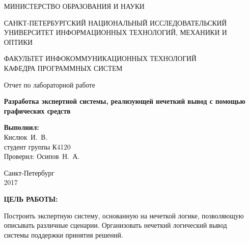 \documentclass[14pt,a4paper]{extreport}
\newcommand{\header}[1]{%
{
\clearpage%
\fontsize{16pt}{14pt}\selectfont
\begin{center}
\textbf{\MakeUppercase{#1}:}
\end{center}
}
}
\newcommand{\labyear}{2017}
\newcommand{\labtitle}{Разработка экспертной системы, реализующей нечеткий вывод с помощью графических средств}
\newcommand{\prepod}{Осипов~Н.~А.}
\newcommand{\student}{Кислюк~И.~В.}
\begin{document}
	\begin{titlepage}
	\begin{center}	
		\fontsize{14pt}{14pt}\selectfont
		МИНИСТЕРСТВО ОБРАЗОВАНИЯ И НАУКИ\\

		\vspace*{0.6\baselineskip}

		\MakeUppercase{Санкт-Петербургский Национальный Исследовательский Университет Информационных технологий, механики и оптики}		
		
		\vspace*{0.6\baselineskip}
		\MakeUppercase{Факультет Инфокоммуникационных технологий}\\
		\MakeUppercase{Кафедра программных систем}
	
		\vspace*{7\baselineskip}
		\fontsize{19pt}{18pt}\selectfont
		Отчет по лабораторной работе
		
		\fontsize{20pt}{18pt}\selectfont
		\textbf{\labtitle}\\
		\vspace*{1.15\baselineskip}
		\end{center}
	
	\vspace*{2\baselineskip}
	\begin{flushright}
	\fontsize{14pt}{14pt}\selectfont
	\textbf{Выполнил:}\\
	\student\\
	студент группы К4120\\
	Проверил: \prepod\\
	\end{flushright}
	
	\vspace{\fill}
	\begin{center}
	Санкт-Петербург\\
	\vspace{-1ex}
	\labyear
	\end{center}
	
\end{titlepage}

\fontsize{14pt}{14pt}\selectfont

\header{Цель работы}



Построить экспертную систему, основанную на нечеткой логике, позволяющую описывать различные сценарии. Организовать нечеткий логический вывод системы поддержки принятия решений.
\end{document}
